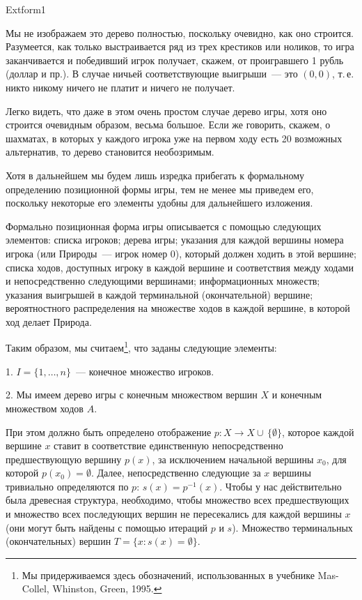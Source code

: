 Extform1


Мы не изображаем это дерево полностью, поскольку очевидно, как оно
строится. Разумеется, как только выстраивается ряд из трех крестиков
или ноликов, то игра заканчивается и победивший игрок получает,
скажем, от проигравшего 1 рубль (доллар и пр.). В случае ничьей
соответствующие выигрыши~--- это $(0,0)$, т.\,е. никто никому ничего
не платит и ничего не получает.

Легко видеть, что даже в этом очень простом случае дерево игры,
хотя оно строится очевидным образом, весьма большое. Если же говорить,
скажем, о шахматах, в которых у каждого игрока уже на первом ходу
есть 20 возможных альтернатив, то дерево становится необозримым.

Хотя в дальнейшем мы будем лишь изредка прибегать к формальному
определению позиционной формы игры, тем не менее мы приведем его,
поскольку некоторые его элементы удобны для дальнейшего изложения.

Формально позиционная форма игры описывается с помощью следующих
элементов: списка игроков; дерева игры; указания для каждой вершины
номера игрока (или Природы~--- игрок номер $0$), который должен
ходить в этой вершине; списка ходов, доступных игроку в каждой
вершине и соответствия между ходами и непосредственно следующими
вершинами; информационных множеств; указания выигрышей в каждой
терминальной (окончательной) вершине; вероятностного распределения
на множестве ходов в каждой вершине, в которой ход  делает Природа.

Таким образом, мы считаем\footnote{ Мы придерживаемся здесь
обозначений, использованных в учебнике Mas-Collel, Whinston,
Green, 1995.}, что заданы следующие элементы:

1. $I=\{1,\ldots,n\}$~--- конечное множество игроков.

2. Мы имеем дерево игры с конечным множеством вершин $X$  и конечным
множеством ходов $A$.

При этом должно быть определено отображение $p:X\to
X\cup\,\{\emptyset\}$, которое каждой вершине $x$ ставит в
соответствие единственную непосредственно предшествующую  вершину
$p(x)$, за исключением начальной вершины $x_0$, для которой
$p(x_0)=\emptyset$. Далее, непосредственно следующие за $x$ вершины
тривиально определяются по $p$: $s(x)=p^{-1}(x)$. Чтобы у нас
действительно была древесная структура, необходимо, чтобы множество
всех предшествующих и множество всех последующих  вершин не
пересекались для каждой вершины $x$ (они могут быть найдены с
помощью итераций $p$ и $s$). Множество терминальных (окончательных)
вершин $T=\{x:s(x)=\emptyset\}$.

